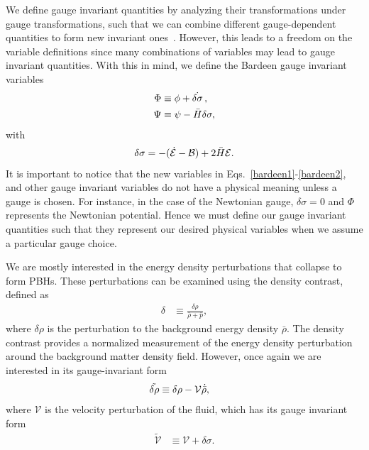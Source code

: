 \documentclass[a4paper,11pt]{article}
\begin{document}
We define gauge invariant quantities by analyzing their transformations under gauge transformations, such that we can combine different gauge-dependent quantities to form new invariant ones~\cite{covariant_bardeen}. However, this leads to a freedom on the variable definitions since many combinations of variables may lead to gauge invariant quantities. With this in mind, we define the Bardeen gauge invariant variables~\cite{Bardeen1980}
\begin{align}
	\label{bardeen1}
	\Phi & \equiv \phi + \dot{\delta \sigma}\, , \\
	\label{bardeen2}
	\Psi & \equiv \psi - \Bar{H}\delta \sigma
	,\end{align}
with
\begin{align}
	\delta\sigma = -(\dot{\mathcal{E}} - \mathcal{B}) + {2 \Bar{H}\mathcal{E}}
	.\end{align}
It is important to notice that the new variables in
Eqs.~\eqref{bardeen1}-\eqref{bardeen2}, and other gauge invariant variables do not have
a physical meaning unless a gauge is chosen. For instance, in the case of the Newtonian
gauge, $\delta\sigma = 0$ and $\Phi$ represents the Newtonian potential. Hence we must
define our gauge invariant quantities such that they represent our desired physical
variables when we assume a particular gauge choice.

We are mostly interested in the energy density perturbations that collapse to form PBHs.
These perturbations can be examined using the density contrast, defined as
\begin{align}
	\label{densitycon}
	\delta & \equiv \frac{\delta \rho}{\bar{\rho} + \bar{p}}
	,\end{align}
where $\delta\rho$ is the perturbation to the background energy density $\bar\rho$. The
density contrast provides a normalized measurement of the energy density perturbation
around the background matter density field. However, once again we are interested in its
gauge-invariant form
\begin{align}
	\label{deltarhoinvariant}
	\tilde{\delta\rho} & \equiv \delta\rho - \mathcal{V} \dot{\Bar{\rho}}
	,\end{align}
where $\mathcal{V}$ is the velocity perturbation of the fluid, which has its gauge
invariant form
\begin{align}
	\tilde{\mathcal{V}} & \equiv \mathcal{V} + \delta\sigma
	.\end{align}
\end{document}
